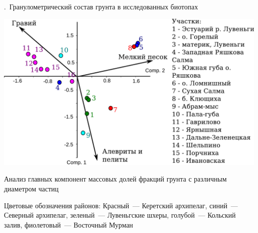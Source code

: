 \documentclass[aspectratio=169, xcolor=table]{beamer}
\begin{document}


\begin{frame}{\insertpagenumber.\ Гранулометрический состав грунта в исследованных биотопах}

			\includegraphics[width=.75\textwidth]{pca_grunt.pdf}

{\tiny Анализ главных компонент массовых долей фракций грунта с различным диаметром частиц}
%

{\tiny Цветовые обозначения районов: Красный~--- Керетский архипелаг, синий~--- Северный архипелаг, зеленый~--- Лувеньгские шхеры, голубой~--- Кольский залив, фиолетовый~--- Восточный Мурман}
\end{frame}
\end{document}
